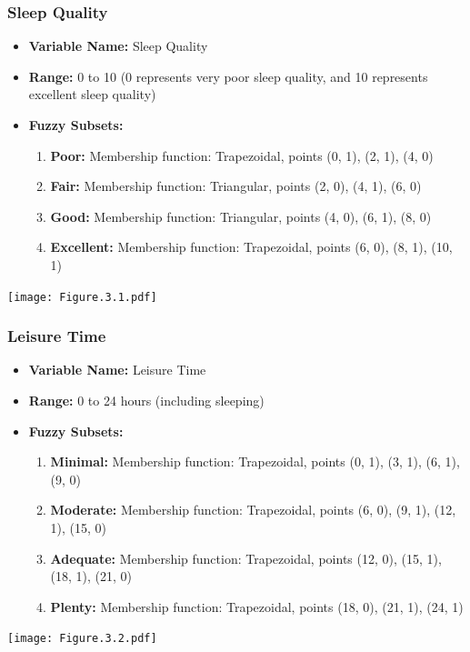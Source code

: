 \documentclass[12pt, a4paper]{article}
\begin{document}
\subsubsection*{Sleep Quality}
\begin{itemize}
    \item \textbf{Variable Name:} Sleep Quality
    \item \textbf{Range:} 0 to 10 (0 represents very poor sleep quality, and 10 represents excellent sleep quality)
    \item \textbf{Fuzzy Subsets:}
    \begin{enumerate}
        \item \textbf{Poor:} Membership function: Trapezoidal, points (0, 1), (2, 1), (4, 0)
        \item \textbf{Fair:} Membership function: Triangular, points (2, 0), (4, 1), (6, 0)
        \item \textbf{Good:} Membership function: Triangular, points (4, 0), (6, 1), (8, 0)
        \item \textbf{Excellent:} Membership function: Trapezoidal, points (6, 0), (8, 1), (10, 1)
    \end{enumerate}
\end{itemize}
\texttt{[image: Figure.3.1.pdf]}

\subsubsection*{Leisure Time}
\begin{itemize}
    \item \textbf{Variable Name:} Leisure Time
    \item \textbf{Range:} 0 to 24 hours (including sleeping)
    \item \textbf{Fuzzy Subsets:}
    \begin{enumerate}
        \item \textbf{Minimal:} Membership function: Trapezoidal, points (0, 1), (3, 1), (6, 1), (9, 0)
        \item \textbf{Moderate:} Membership function: Trapezoidal, points (6, 0), (9, 1), (12, 1), (15, 0)
        \item \textbf{Adequate:} Membership function: Trapezoidal, points (12, 0), (15, 1), (18, 1), (21, 0)
        \item \textbf{Plenty:} Membership function: Trapezoidal, points (18, 0), (21, 1), (24, 1)
    \end{enumerate}
\end{itemize}
\texttt{[image: Figure.3.2.pdf]}
\end{document}
